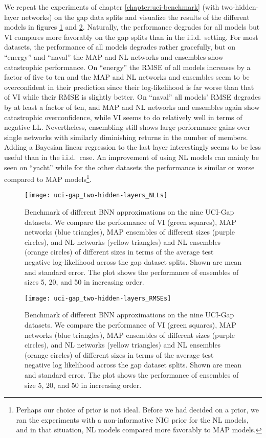 \documentclass[../thesis.tex]{subfiles}
\begin{document}
We repeat the experiments of chapter \ref{chapter:uci-benchmark} (with two-hidden-layer networks) on the gap data splits and visualize the results of the different models in figures \ref{fig:uci-gap-benchmark-nll} and \ref{fig:uci-gap-benchmark-rmse}. Naturally, the performance degrades for all models but VI compares more favorably on the gap splits than in the i.i.d.\ setting. For most datasets, the performance of all models degrades rather gracefully, but on ``energy'' and ``naval'' the MAP and NL networks and ensembles show catastrophic performance. On ``energy'' the RMSE of all models increases by a factor of five to ten and the MAP and NL networks and ensembles seem to be overconfident in their prediction since their log-likelihood is far worse than that of VI while their RMSE is slightly better. On ``naval'' all models' RMSE degrades by at least a factor of ten, and MAP and NL networks and ensembles again show catastrophic overconfidence, while VI seems to do relatively well in terms of negative LL. Nevertheless, ensembling still shows large performance gains over single networks with similarly diminishing returns in the number of members. Adding a Bayesian linear regression to the last layer interestingly seems to be less useful than in the i.i.d.\ case. An improvement of using NL models can mainly be seen on ``yacht'' while for the other datasets the performance is similar or worse compared to MAP models\footnote{Perhaps our choice of prior is not ideal. Before we had decided on a prior, we ran the experiments with a non-informative NIG prior for the NL models, and in that situation, NL models compared more favorably to MAP models.}.

\begin{figure}
    \centering
    \texttt{[image: uci-gap\_two-hidden-layers\_NLLs]} 
    \caption{Benchmark of different BNN approximations on the nine UCI-Gap datasets. We compare the performance of VI (green squares), MAP networks (blue triangles), MAP ensembles of different sizes (purple circles), and NL networks (yellow triangles) and NL ensembles (orange circles) of different sizes in terms of the average test negative log-likelihood across the gap dataset splits. Shown are mean and standard error. The plot shows the performance of ensembles of sizes 5, 20, and 50 in increasing order.}
    \label{fig:uci-gap-benchmark-nll}
\end{figure}

\begin{figure}
    \centering
    \texttt{[image: uci-gap\_two-hidden-layers\_RMSEs]} 
    \caption{Benchmark of different BNN approximations on the nine UCI-Gap datasets. We compare the performance of VI (green squares), MAP networks (blue triangles), MAP ensembles of different sizes (purple circles), and NL networks (yellow triangles) and NL ensembles (orange circles) of different sizes in terms of the average test negative log likelihood across the gap dataset splits. Shown are mean and standard error. The plot shows the performance of ensembles of size 5, 20, and 50 in increasing order.}
    \label{fig:uci-gap-benchmark-rmse}
\end{figure}
\end{document}
